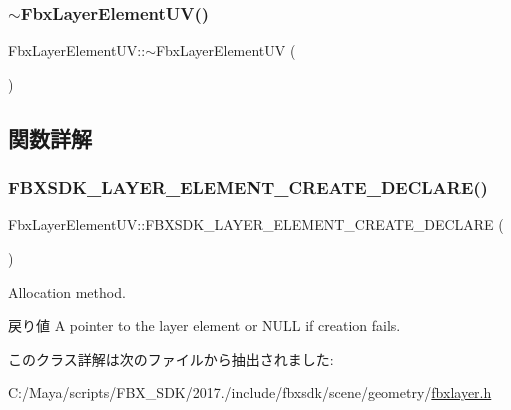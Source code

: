 \subsubsection{\texorpdfstring{$\sim$\+Fbx\+Layer\+Element\+U\+V()}{~FbxLayerElementUV()}}
{\footnotesize\ttfamily Fbx\+Layer\+Element\+U\+V\+::$\sim$\+Fbx\+Layer\+Element\+UV (\begin{DoxyParamCaption}{ }\end{DoxyParamCaption})\hspace{0.3cm}{\ttfamily [protected]}}



\subsection{関数詳解}
\mbox{\label{class_fbx_layer_element_u_v_a724a1f79f2ff129ca3be535db9de2245}} 
\subsubsection{\texorpdfstring{F\+B\+X\+S\+D\+K\+\_\+\+L\+A\+Y\+E\+R\+\_\+\+E\+L\+E\+M\+E\+N\+T\+\_\+\+C\+R\+E\+A\+T\+E\+\_\+\+D\+E\+C\+L\+A\+R\+E()}{FBXSDK\_LAYER\_ELEMENT\_CREATE\_DECLARE()}}
{\footnotesize\ttfamily Fbx\+Layer\+Element\+U\+V\+::\+F\+B\+X\+S\+D\+K\+\_\+\+L\+A\+Y\+E\+R\+\_\+\+E\+L\+E\+M\+E\+N\+T\+\_\+\+C\+R\+E\+A\+T\+E\+\_\+\+D\+E\+C\+L\+A\+RE (\begin{DoxyParamCaption}\item[{Layer\+Element\+UV}]{ }\end{DoxyParamCaption})}

Allocation method. \begin{DoxyReturn}{戻り値}
A pointer to the layer element or {\ttfamily N\+U\+LL} if creation fails. 
\end{DoxyReturn}


このクラス詳解は次のファイルから抽出されました\+:\begin{DoxyCompactItemize}
\item 
C\+:/\+Maya/scripts/\+F\+B\+X\+\_\+\+S\+D\+K/2017./include/fbxsdk/scene/geometry/\hyperlink{fbxlayer_8h}{fbxlayer.\+h}\end{DoxyCompactItemize}
